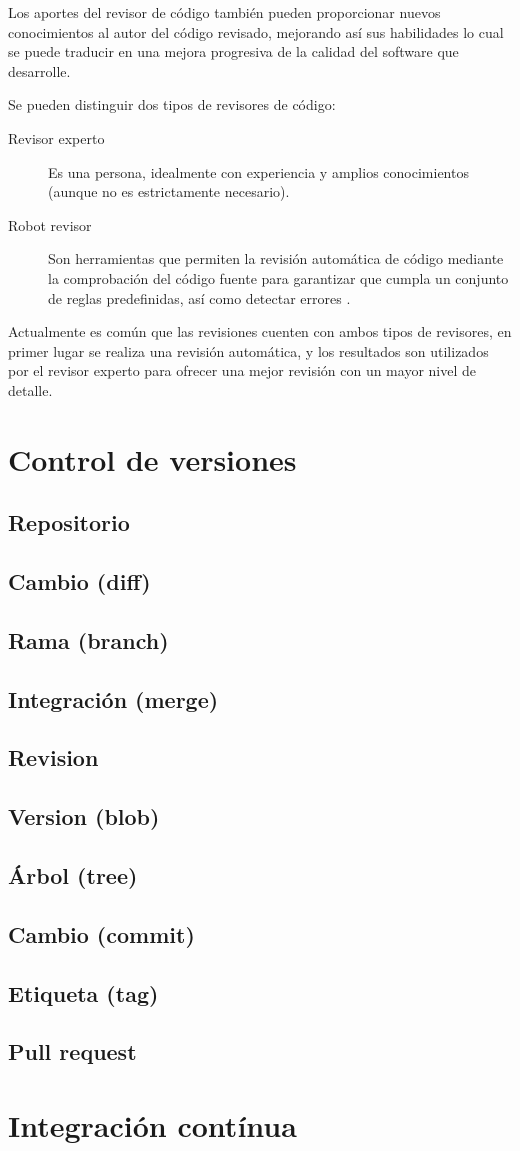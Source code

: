 Los aportes del revisor de código también pueden proporcionar nuevos conocimientos al autor del código revisado, mejorando así sus habilidades lo cual se puede traducir en una mejora progresiva de la calidad del software que desarrolle.

Se pueden distinguir dos tipos de revisores de código:

\begin{description}
	\item[Revisor experto] Es una persona, idealmente con experiencia y amplios conocimientos (aunque no es estrictamente necesario).
	\item[Robot revisor] Son herramientas que permiten la revisión automática de código mediante la comprobación del código fuente para garantizar que cumpla un conjunto de reglas predefinidas, así como detectar errores \cite{wiki:001}.
\end{description}

Actualmente es común que las revisiones cuenten con ambos tipos de revisores, en primer lugar se realiza una revisión automática, y los resultados son utilizados por el revisor experto para ofrecer una mejor revisión con un mayor nivel de detalle.

\section{Control de versiones}



\subsection{Repositorio}
\subsection{Cambio (diff)}
\subsection{Rama (branch)}
\subsection{Integración (merge)}
\subsection{Revision}
\subsection{Version (blob)}
\subsection{Árbol (tree)}
\subsection{Cambio (commit)}
\subsection{Etiqueta (tag)}
\subsection{Pull request}
\section{Integración contínua}